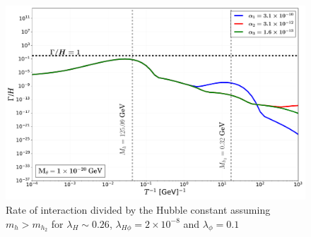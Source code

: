 \begin{frame}
        \begin{figure}
         \centering
         \includegraphics[width=.8\textwidth]{Figures/ratedm_lesser.pdf}
        \caption{Rate of interaction divided by the Hubble constant assuming $m_h > m_{h_2}$ for $\lambda_H\sim0.26$, $\lambda_{H\phi}=2\times10^{-8}$ and $\lambda_\phi=0.1$}
        \label{fig:rot}
    \end{figure}
\end{frame}